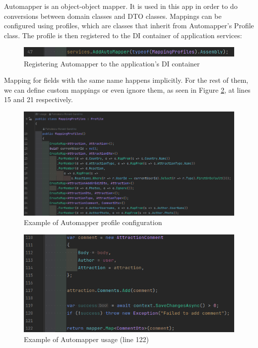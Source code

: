 \par Automapper is an object-object mapper. It is used in this app in order to do conversions between domain classes and DTO classes. Mappings can be configured using profiles, which are classes that inherit from Automapper's Profile class. The profile is then registered to the DI container of application services:

\begin{figure}[!ht]
    \centering
    \includegraphics[width=1\linewidth]{4.3.2_automapper-injection.png}
    \caption{Registering Automapper to the application's DI container}
    \label{fig:automapper-injection}
\end{figure}

\clearpage %

\par Mapping for fields with the same name happens implicitly. For the rest of them, we can define custom mappings or even ignore them, as seen in Figure \ref{fig:automapper-profile}, at lines 15 and 21 respectively.

\begin{figure}[!ht]
        \centering
        \includegraphics[width=1\linewidth]{4.3.2_automapper-profile.png}
        \caption{Example of Automapper profile configuration}
        \label{fig:automapper-profile}
\end{figure}

\begin{figure}[!ht]
    \centering
    \includegraphics[width=1\linewidth]{4.3.2_automapper-usage.png}
    \caption{Example of Automapper usage (line 122)}
    \label{fig:automapper-usage}
\end{figure}


